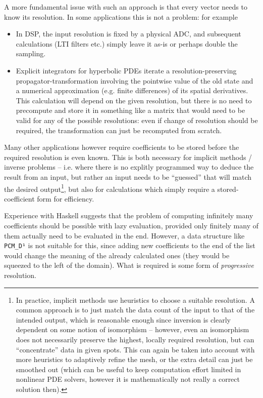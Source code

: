 \documentclass[sigplan,review,anonymous]{acmart}\settopmatter{printfolios=true,printccs=false,printacmref=false}
\theoremstyle{acmplain}
\theoremstyle{acmdefinition}
\begin{document}
A more fundamental issue with such an approach is that every vector needs to know its resolution.
In some applications this is not a problem: for example
\begin{itemize}
 \item In DSP, the input resolution is fixed by a physical ADC, and subsequent calculations (LTI filters etc.) simply leave it as-is or perhaps double the sampling.
 \item Explicit integrators for hyperbolic PDEs iterate a re\-so\-lu\-tion-pre\-ser\-ving pro\-pa\-ga\-tor-trans\-for\-ma\-tion in\-vol\-ving the pointwise value of the old state and a numerical approximation (e.g. finite differences) of its spatial derivatives. This calculation will depend on the given resolution, but there is no need to precompute and store it in something like a matrix that would need to be valid for any of the possible resolutions: even if change of resolution should be required, the transformation can just be recomputed from scratch.
\end{itemize}
Many other applications however require coefficients to be stored before the required resolution is even known.
This is both necessary for implicit methods / inverse problems -- i.e. where there is no explitly programmed way to deduce the result from an input, but rather an input needs to be “guessed” that will match the desired output\footnote{
In practice, implicit methods use heuristics to choose a suitable resolution. A common approach is to just match the data count of the input to that of the intended output, which is reasonable enough since inversion is clearly dependent on some notion of isomorphism -- however, even an isomorphism does not necessarily preserve the highest, locally required resolution, but can “concentrate” data in given spots. This can again be taken into account with more heuristics to adaptively refine the mesh, or the extra detail can just be smoothed out (which can be useful to keep computation effort limited in nonlinear PDE solvers, however it is mathematically not really a correct solution then).
}, but also for calculations which simply require a stored-coefficient form for efficiency.

Experience with Haskell suggests that the problem of computing infinitely many coefficients should be possible with lazy evaluation, provided only finitely many of them actually need to be evaluated in the end.
However, a data structure like \lstinline`PCM_D¹` is not suitable for this, since adding new coefficients to the end of the list would change the meaning of the already calculated ones (they would be squeezed to the left of the domain).
What is required is some form of \emph{progressive} resolution.
\end{document}
